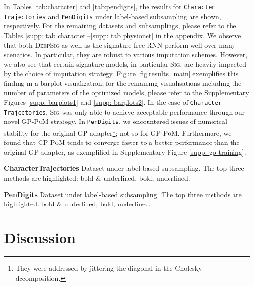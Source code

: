 \documentclass{article}
\begin{document}
In Tables \ref{tab:character} and \ref{tab:pendigits}, the results for \texttt{Character Trajectories} and \texttt{PenDigits} under label-based subsampling are shown, respectively. For the remaining datasets and subsamplings, please refer to the Tables \ref{supp: tab character}--\ref{supp: tab physionet} in the appendix. 
We observe that both \textsc{DeepSig} as well as the signature-free \textsc{RNN} perform well
over many scenarios. In particular, they are robust to various
imputation schemes. However, we also see that certain signature models,
in particular \textsc{Sig}, are heavily impacted by the choice of
imputation strategy. Figure \ref{fig:results_main} exemplifies this finding in a barplot visualization; for the remaining visualisations including the number of parameters of the optimized models, please refer to the Supplementary Figures \ref{supp: barplots1} and \ref{supp: barplots2}. In the case of \texttt{Character Trajectories},
\textsc{Sig} was only able to achieve acceptable performance through
our novel \textsc{GP-PoM} strategy. In \texttt{PenDigits}, we encountered
issues of numerical stability for the original GP adapter\footnote{They
were addressed by jittering the diagonal in the Cholesky
decomposition.}; not so for \textsc{GP-PoM}. Furthermore, we found that \textsc{GP-PoM} tends to converge faster to a better performance than the original GP adapter, as exemplified in Supplementary Figure \ref{supp: gp-training}.

\begin{table}[h]
    \caption{\textbf{CharacterTrajectories} Dataset under label-based subsampling. The top three methods are highlighted: bold \& underlined, bold, underlined.}
    \centering
    
    \label{tab:character}
\end{table}
\begin{table}[h]
    \caption{\textbf{PenDigits} Dataset under label-based subsampling. The top three methods are highlighted: bold \& underlined, bold, underlined.}
    \centering
    
    \label{tab:pendigits}
\end{table}



\section{Discussion}
\end{document}
